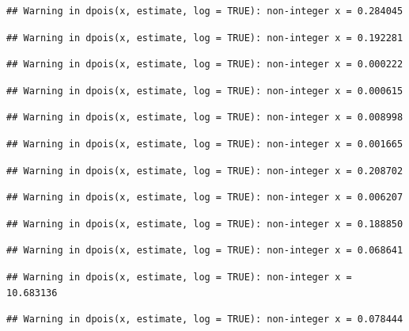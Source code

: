 \documentclass[]{article}
\begin{document}
\begin{verbatim}
## Warning in dpois(x, estimate, log = TRUE): non-integer x = 0.284045
\end{verbatim}

\begin{verbatim}
## Warning in dpois(x, estimate, log = TRUE): non-integer x = 0.192281
\end{verbatim}

\begin{verbatim}
## Warning in dpois(x, estimate, log = TRUE): non-integer x = 0.000222
\end{verbatim}

\begin{verbatim}
## Warning in dpois(x, estimate, log = TRUE): non-integer x = 0.000615
\end{verbatim}

\begin{verbatim}
## Warning in dpois(x, estimate, log = TRUE): non-integer x = 0.008998
\end{verbatim}

\begin{verbatim}
## Warning in dpois(x, estimate, log = TRUE): non-integer x = 0.001665
\end{verbatim}

\begin{verbatim}
## Warning in dpois(x, estimate, log = TRUE): non-integer x = 0.208702
\end{verbatim}

\begin{verbatim}
## Warning in dpois(x, estimate, log = TRUE): non-integer x = 0.006207
\end{verbatim}

\begin{verbatim}
## Warning in dpois(x, estimate, log = TRUE): non-integer x = 0.188850
\end{verbatim}

\begin{verbatim}
## Warning in dpois(x, estimate, log = TRUE): non-integer x = 0.068641
\end{verbatim}

\begin{verbatim}
## Warning in dpois(x, estimate, log = TRUE): non-integer x = 10.683136
\end{verbatim}

\begin{verbatim}
## Warning in dpois(x, estimate, log = TRUE): non-integer x = 0.078444
\end{verbatim}
\end{document}
